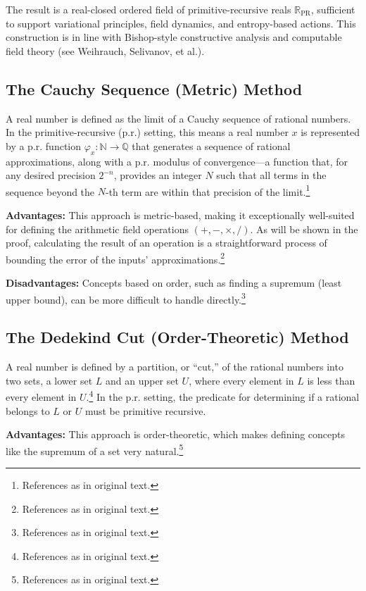 \documentclass[12pt, a4paper]{article}
\begin{document}
The result is a real-closed ordered field of primitive-recursive reals \(\mathbb{R}_{\mathrm{PR}}\), sufficient to support variational principles, field dynamics, and entropy-based actions. This construction is in line with Bishop-style constructive analysis and computable field theory (see Weihrauch, Selivanov, et al.).

\subsection{The Cauchy Sequence (Metric) Method}

A real number is defined as the limit of a Cauchy sequence of rational numbers. In the primitive-recursive (p.r.) setting, this means a real number \( x \) is represented by a p.r. function \(\varphi_x : \mathbb{N} \to \mathbb{Q}\) that generates a sequence of rational approximations, along with a p.r. modulus of convergence—a function that, for any desired precision \( 2^{-n} \), provides an integer \( N \) such that all terms in the sequence beyond the \( N \)-th term are within that precision of the limit.\footnote{References as in original text.}

\textbf{Advantages:} This approach is metric-based, making it exceptionally well-suited for defining the arithmetic field operations \((+, -, \times, /)\). As will be shown in the proof, calculating the result of an operation is a straightforward process of bounding the error of the inputs' approximations.\footnote{References as in original text.}

\textbf{Disadvantages:} Concepts based on order, such as finding a supremum (least upper bound), can be more difficult to handle directly.\footnote{References as in original text.}

\subsection{The Dedekind Cut (Order-Theoretic) Method}

A real number is defined by a partition, or ``cut,'' of the rational numbers into two sets, a lower set \( L \) and an upper set \( U \), where every element in \( L \) is less than every element in \( U \).\footnote{References as in original text.} In the p.r. setting, the predicate for determining if a rational belongs to \( L \) or \( U \) must be primitive recursive.

\textbf{Advantages:} This approach is order-theoretic, which makes defining concepts like the supremum of a set very natural.\footnote{References as in original text.}
\end{document}

